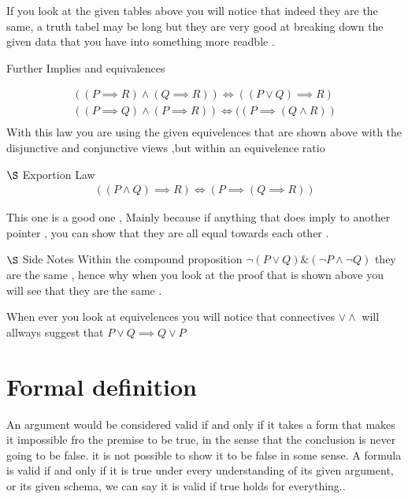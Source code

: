 \documentclass{article}
\theoremstyle{mytheoremstyle}
\theoremstyle{mytheoremstyle}
\theoremstyle{myproblemstyle}
\begin{document}
If you look at the given tables above you will notice that indeed they are the same, a truth tabel may be long but they are very good at breaking down the given data that you have into something more readble .


\item Further Implies and equivalences

\[\begin{array}{c}
		((P \implies R) \land (Q \implies R)) \iff ((P \lor Q) \implies R)   \\
		((P \implies Q) \land (P \implies R)) \iff ((P \implies (Q \land R)) \\
	\end{array}\]
With this law you are using the given equivelences that are shown above with the disjunctive and conjunctive views ,but within an equivelence ratio


\item  $\S$ Exportion Law
\[\begin{array}{c}
		((P \land Q) \implies R) \iff (P \implies (Q \implies R))
	\end{array}\]

This one is a good one , Mainly because if anything that does imply to another pointer , you can show that they are all equal towards each other .



\item $\S$ Side Notes
Within the compound proposition $\neg(P \lor Q) \&  (\neg P \land \neg Q) $ they are the same , hence why when you look at the proof that is shown above you will see that they are the same .

When ever you look at equivelences you will notice that connectives $ \lor \land $ will allways suggest that $ P \lor Q \implies Q \lor P $

\newpage

\section{Formal definition }

\begin{definition}[Valid]
	An argument would be considered valid if and only if it takes a form that makes it impossible fro the premise to be true, in the sense that the conclusion is never going to be false. it is not possible to show it to be false in some sense.
	A formula is valid if and only if it is true under every understanding of its given argument, or its given schema, we can say it is valid if true holds for everything..
\end{definition}
\end{document}
